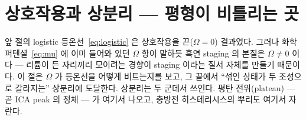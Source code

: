 \documentclass[11pt,a4paper]{article}
\begin{document}
\section{상호작용과 상분리 — 평형이 비틀리는 곳}\label{sec:regsol}
앞 절의 logistic 등온선~\eqref{eq:logistic} 은 상호작용을 끈($\Omega=0$) 결과였다. 그러나
화학퍼텐셜~\eqref{eq:mu} 에 이미 들어와 있던 $\Omega$ 항이 말하듯 흑연 staging 의 본질은
$\Omega\ne0$ 이다 — 리튬이 든 자리끼리 모이려는 경향이 staging 이라는 질서 자체를 만들기 때문이다. 이
절은 $\Omega$ 가 등온선을 어떻게 비트는지를 보고, 그 끝에서 ``섞인 상태가 두 조성으로 갈라지는'' 상분리에
도달한다. 상분리는 두 군데서 쓰인다. 평탄 전위(plateau) — 곧 ICA peak 의 정체 — 가 여기서 나오고, 충방전
히스테리시스의 뿌리도 여기서 자란다.
\end{document}
